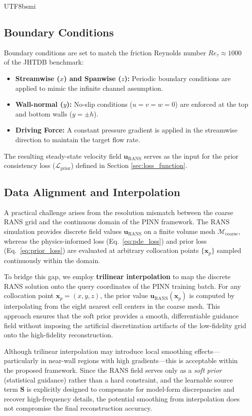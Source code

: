 \documentclass[master]{NTHUthesis}
\begin{document}
\begin{CJK*}{UTF8}{bsmi}
\subsection{Boundary Conditions}
Boundary conditions are set to match the friction Reynolds number $Re_\tau \approx 1000$ of the JHTDB benchmark:
\begin{itemize}
    \item \textbf{Streamwise ($x$) and Spanwise ($z$):} Periodic boundary conditions are applied to mimic the infinite channel assumption.
    \item \textbf{Wall-normal ($y$):} No-slip conditions ($u=v=w=0$) are enforced at the top and bottom walls ($y = \pm h$).
    \item \textbf{Driving Force:} A constant pressure gradient is applied in the streamwise direction to maintain the target flow rate.
\end{itemize}
The resulting steady-state velocity field $\mathbf{u}_{\text{RANS}}$ serves as the input for the prior consistency loss ($\mathcal{L}_{\text{prior}}$) defined in Section \ref{sec:loss_function}.

\subsection{Data Alignment and Interpolation}
A practical challenge arises from the resolution mismatch between the coarse RANS grid and the continuous domain of the PINN framework. The RANS simulation provides discrete field values $\mathbf{u}_{\text{RANS}}$ on a finite volume mesh $\mathcal{M}_{\text{coarse}}$, whereas the physics-informed loss (Eq.~\ref{eq:pde_loss}) and prior loss (Eq.~\ref{eq:prior_loss}) are evaluated at arbitrary collocation points $\{\mathbf{x}_p\}$ sampled continuously within the domain.

To bridge this gap, we employ \textbf{trilinear interpolation} to map the discrete RANS solution onto the query coordinates of the PINN training batch. For any collocation point $\mathbf{x}_p = (x, y, z)$, the prior value $\mathbf{u}_{\text{RANS}}(\mathbf{x}_p)$ is computed by interpolating from the eight nearest cell centers in the coarse mesh. This approach ensures that the soft prior provides a smooth, differentiable guidance field without imposing the artificial discretization artifacts of the low-fidelity grid onto the high-fidelity reconstruction.

Although trilinear interpolation may introduce local smoothing effects---particularly in near-wall regions with high gradients---this is acceptable within the proposed framework.
Since the RANS field serves only as a \emph{soft prior} (statistical guidance) rather than a hard constraint, and the learnable source term $\mathbf{S}$ is explicitly designed to compensate for model-form discrepancies and recover high-frequency details, the potential smoothing from interpolation does not compromise the final reconstruction accuracy.


\end{CJK*}
\end{document}
